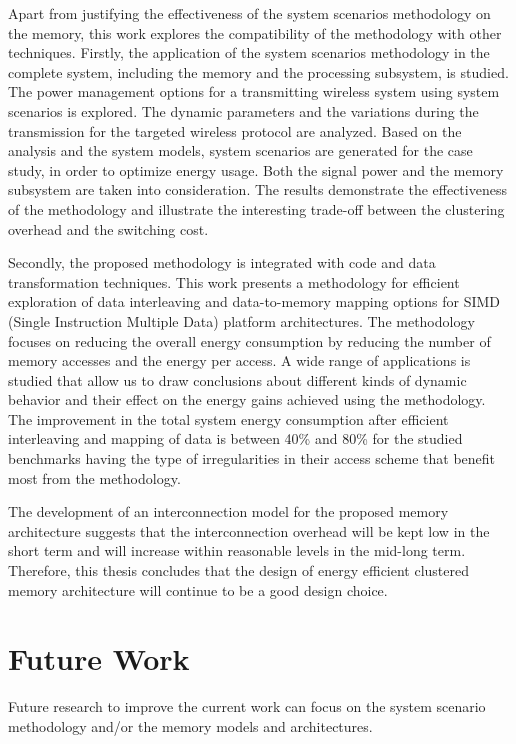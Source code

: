 Apart from justifying the effectiveness of the system scenarios methodology on the memory, this work explores the compatibility of the methodology with other techniques.
Firstly, the application of the system scenarios methodology in the complete system, including the memory and the processing subsystem, is studied.
The power management options for a transmitting wireless system using system scenarios is explored. 
The dynamic parameters and the variations during the transmission for the targeted wireless protocol are analyzed. 
Based on the analysis and the system models, system scenarios are generated for the case study, in order to optimize energy usage. 
Both the signal power and the memory subsystem are taken into consideration. 
The results demonstrate the effectiveness of the methodology and illustrate the interesting trade-off between the clustering overhead and the switching cost. 

Secondly, the proposed methodology is integrated with code and data transformation techniques.
This work presents a methodology for efficient exploration of data interleaving and data-to-memory mapping options for SIMD (Single Instruction Multiple Data) platform architectures.
The methodology focuses on reducing the overall energy consumption by reducing the number of memory accesses and the energy per access.
A wide range of applications is studied that allow us to draw conclusions about different kinds of dynamic behavior and their effect on the energy gains achieved using the methodology. 
The improvement in the total system energy consumption after efficient interleaving and mapping of data is between 40\% and 80\% for the studied benchmarks having the type of irregularities in their access scheme that benefit most from the methodology.

The development of an interconnection model for the proposed memory architecture suggests that the interconnection overhead will be kept low in the short term and will increase within reasonable levels in the mid-long term.
Therefore, this thesis concludes that the design of energy efficient clustered memory architecture will continue to be a good design choice.

\section{Future Work}

Future research to improve the current work can focus on the system scenario methodology and/or the memory models and architectures.


